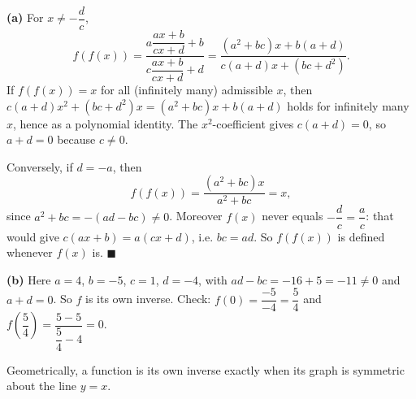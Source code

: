 \textbf{(a)} For $x\ne-\dfrac dc$,
\[f(f(x))=\dfrac{a\dfrac{ax+b}{cx+d}+b}{c\dfrac{ax+b}{cx+d}+d}=\dfrac{\left(a^2+bc\right)x+b(a+d)}{c(a+d)x+\left(bc+d^2\right)}.\]
If $f(f(x))=x$ for all (infinitely many) admissible $x$, then $c(a+d)x^2+\left(bc+d^2\right)x=\left(a^2+bc\right)x+b(a+d)$ holds for infinitely many $x$, hence as a polynomial identity. The $x^2$-coefficient gives $c(a+d)=0$, so $a+d=0$ because $c\ne0$.

Conversely, if $d=-a$, then
\[f(f(x))=\dfrac{\left(a^2+bc\right)x}{a^2+bc}=x,\]
since $a^2+bc=-(ad-bc)\ne0$. Moreover $f(x)$ never equals $-\dfrac dc=\dfrac ac$: that would give $c(ax+b)=a(cx+d)$, i.e. $bc=ad$. So $f(f(x))$ is defined whenever $f(x)$ is. $\blacksquare$

\textbf{(b)} Here $a=4$, $b=-5$, $c=1$, $d=-4$, with $ad-bc=-16+5=-11\ne0$ and $a+d=0$. So $f$ is its own inverse. Check: $f(0)=\dfrac{-5}{-4}=\dfrac54$ and $f\left(\dfrac54\right)=\dfrac{5-5}{\dfrac54-4}=0$.

Geometrically, a function is its own inverse exactly when its graph is symmetric about the line $y=x$.
